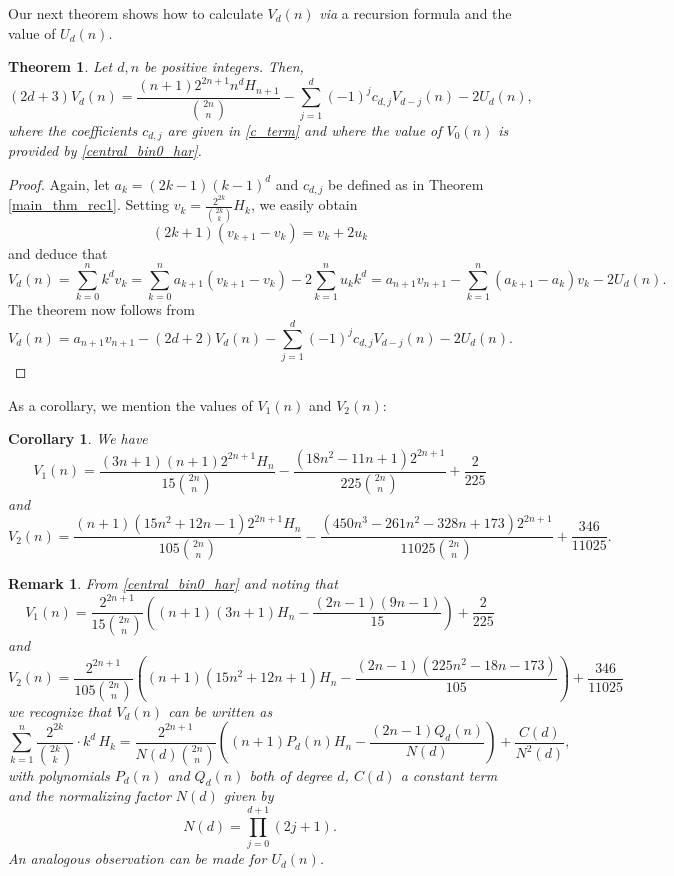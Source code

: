 \documentclass[11pt,reqno]{amsart}
\theoremstyle{plain}
\numberwithin{equation}{section}
\newtheorem{theorem}[thm]{Theorem}
\newtheorem{corollary}[thm]{Corollary}
\newtheorem{remark}[thm]{Remark}
\begin{document}
Our next theorem shows how to calculate $V_d(n)$ \textit{via} a recursion formula and the value of $U_d(n)$.

\begin{theorem}\label{main_thm_rec2} 
Let $d,n$ be positive integers. Then, 
\begin{equation}
(2d+3)V_d(n) = \frac{(n+1)2^{2n+1} n^d H_{n+1}}{\binom{2n}{n}} - \sum_{j=1}^d (-1)^j c_{d,j}V_{d-j}(n) - 2U_d(n),
\end{equation}
where the coefficients $c_{d,j}$ are given in \eqref{c_term} and where the value of $V_0(n)$ is provided by \eqref{central_bin0_har}.
\end{theorem} 
\begin{proof}
Again, let $a_k=(2k-1)(k-1)^d$ and $c_{d,j}$ be defined as in Theorem \ref{main_thm_rec1}. Setting $v_k = \frac{2^{2k}}{\binom{2k}{k}}H_k$, 
we easily obtain 
$$(2k+1)(v_{k+1}-v_k) = v_k + 2u_k$$ 
and deduce that
$$V_d(n) = \sum_{k=0}^n k^d v_k = \sum_{k=0}^n a_{k+1}(v_{k+1}-v_k) - 2\sum_{k=1}^n u_k k^d = a_{n+1}v_{n+1} 
- \sum_{k=1}^n(a_{k+1}-a_k) v_k - 2U_d(n).$$
The theorem now follows from
$$V_d(n) = a_{n+1}v_{n+1} - (2d+2)V_d(n) - \sum_{j=1}^d (-1)^j c_{d,j}V_{d-j}(n) - 2U_d(n).$$
\end{proof}

As a corollary, we mention the values of $V_1(n)$ and $V_2(n)$:
\begin{corollary}
We have
\begin{equation}
V_1(n) = \frac{(3n+1)(n+1)2^{2n+1}H_n}{15\binom{2n}{n}}-\frac{(18n^2-11n+1)2^{2n+1}}{225\binom{2n}{n}}+\frac{2}{225}
\end{equation}
and
\begin{equation}
V_2(n) = \frac{(n+1)(15n^2+12n-1)2^{2n+1}H_n}{105\binom{2n}{n}}-\frac{(450n^3-261n^2-328n+173)2^{2n+1}}{11025\binom{2n}{n}}+\frac{346}{11025}.
\end{equation}
\end{corollary}

\begin{remark}\label{PQ-Remark}
From \eqref{central_bin0_har} and noting that
\begin{equation*}
V_1(n) = \frac{2^{2n+1}}{15 \binom{2n}{n}}\left ((n+1)(3n+1)H_n -\frac{(2n-1)(9n-1)}{15}\right ) + \frac{2}{225}
\end{equation*}
and
\begin{equation*}
V_2(n) = \frac{2^{2n+1}}{105 \binom{2n}{n}}\left ((n+1)(15n^2+12n+1)H_n -\frac{(2n-1)(225n^2-18n-173)}{105}\right ) + \frac{346}{11025}
\end{equation*}
we recognize that $V_d(n)$ can be written as
\begin{equation}
\sum_{k=1}^n \frac{2^{2k}}{\binom{2k}{k}} \cdot k^d \,H_k 
= \frac{2^{2n+1}}{N(d) \binom{2n}{n}} \left ( (n+1)P_d(n)H_n -\frac{(2n-1)Q_d(n)}{N(d)}\right ) + \frac{C(d)}{N^2(d)},
\end{equation}
with polynomials $P_d(n)$ and $Q_d(n)$ both of degree $d$, $C(d)$ a constant term and the normalizing factor $N(d)$ given by
$$N(d) = \prod_{j=0}^{d+1} (2j+1).$$
An analogous observation can be made for $U_d(n)$.
\end{remark}
\end{document}
